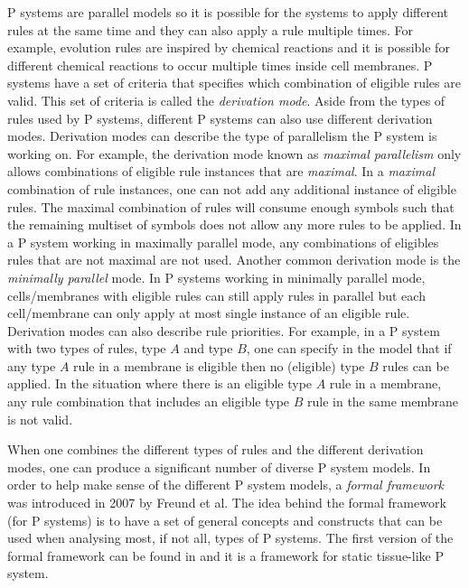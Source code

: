 \documentclass[a4paper]{article}
\theoremstyle{definition}
\begin{document}
P systems are parallel models so it is possible for the systems to apply different rules at
the same time and they can also apply a rule multiple times. For example, evolution rules are 
inspired by chemical reactions and it is possible for different chemical reactions to occur multiple
times inside cell membranes. P systems have a set of criteria that specifies which combination of
eligible rules are valid. This set of criteria is called the \emph{derivation mode}. Aside from the
types of rules used by P systems, different P systems can also use different derivation modes.
Derivation modes can describe the type of parallelism the P system is working on. For example, the
derivation mode known as \emph{maximal parallelism} only allows combinations of eligible rule 
instances that are \emph{maximal}. In a \emph{maximal} combination of rule instances, one can not
add any additional instance of eligible rules. The maximal combination of rules will consume 
enough  symbols such that the remaining multiset of symbols does not allow any more rules to be 
applied. In a P system working in maximally parallel mode, any combinations of eligibles rules that 
are not maximal are not used. Another common derivation mode is the \emph{minimally parallel} mode. 
In P systems working in minimally parallel mode, cells/membranes with eligible rules can still apply
rules in parallel but each cell/membrane can only apply at most single instance of an eligible rule. 
Derivation modes can also describe rule priorities. For example, in a P system with two types of 
rules, type $A$ and type $B$, one can specify in the model that if any type $A$ rule in a membrane 
is eligible then no (eligible) type $B$ rules can be applied. In the situation where there is an 
eligible type $A$ rule in a membrane, any rule combination that includes an eligible type $B$ rule 
in the same membrane is not valid.

When one combines the different types of rules and the different derivation modes, one can produce
a significant number of diverse P system models. In order to help make sense of the different P 
system models, a \emph{formal framework} was introduced in 2007 by Freund et al. The idea behind the 
formal framework (for P systems) is to have a set of general concepts and constructs that can be 
used when analysing most, if not all, types of P systems. The first version of the formal framework
can be found in \cite{freund-2007-ff-1} and it is a framework for static tissue-like P system.
\end{document}

